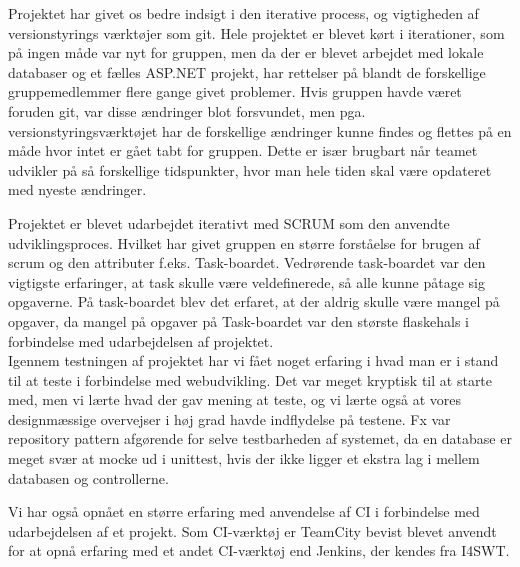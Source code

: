\noindent Projektet har givet os bedre indsigt i den iterative process, og vigtigheden af versionstyrings værktøjer som git. Hele projektet er blevet kørt i iterationer, som på ingen måde var nyt for gruppen, men da der er blevet arbejdet med lokale databaser og et fælles ASP.NET projekt, har rettelser på blandt de forskellige gruppemedlemmer flere gange givet problemer. Hvis gruppen havde været foruden git, var disse ændringer blot forsvundet, men pga. versionstyringsværktøjet har de forskellige ændringer kunne findes og flettes på en måde hvor intet er gået tabt for gruppen. Dette er især brugbart når teamet udvikler på så forskellige tidspunkter, hvor man hele tiden skal være opdateret med nyeste ændringer.

Projektet er blevet udarbejdet iterativt med SCRUM som den anvendte udviklingsproces. Hvilket har givet gruppen en større forståelse for brugen af scrum og den attributer f.eks. Task-boardet. Vedrørende task-boardet var den vigtigste erfaringer, at task skulle være veldefinerede, så alle kunne påtage sig opgaverne. På task-boardet blev det erfaret, at der aldrig skulle være mangel på opgaver, da mangel på opgaver på Task-boardet var den største flaskehals i forbindelse med udarbejdelsen af projektet.\\

\noindent Igennem testningen af projektet har vi fået noget erfaring i hvad man er i stand til at teste i forbindelse med webudvikling. Det var meget kryptisk til at starte med, men vi lærte hvad der gav mening at teste, og vi lærte også at vores designmæssige overvejser i høj grad havde indflydelse på testene. Fx var repository pattern afgørende for selve testbarheden af systemet, da en database er meget svær at mocke ud i unittest, hvis der ikke ligger et ekstra lag i mellem databasen og controllerne.


Vi har også opnået en større erfaring med anvendelse af CI i forbindelse med udarbejdelsen af et projekt. Som CI-værktøj er TeamCity bevist blevet anvendt for at opnå erfaring med et andet CI-værktøj end Jenkins, der kendes fra I4SWT.


